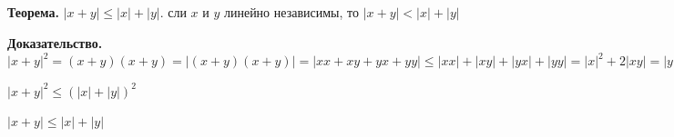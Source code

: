 \documentclass[a4paper]{article}
\begin{document}
\begin{htheorem}
\textbf{Теорема.} $|x+y| \leq |x|+|y|$. сли $x$ и $y$ линейно независимы, то $|x+y| < |x|+ |y|$
\end{htheorem}

\begin{hproof}
\textbf{Доказательство.} 
$|x+y|^2 = (x+y)(x+y) = |(x+y)(x+y)| = |xx+xy+yx+yy| \leq |xx| + |xy| + |yx| + |yy| = |x|^2 + 2|xy| = |y|^2 \leq |x|^2 + 2|x||y| + |y|^2 = (|x| + |y|)^2$

$|x+y|^2 \leq (|x| + |y|)^2$

$|x+y| \leq |x| + |y|$
\end{hproof}

\subsection*{}
\subsection*{}
\subsection*{}
\subsection*{}
\subsection*{}
\subsection*{}
\subsection*{}
\subsection*{}
\subsection*{}
\subsection*{}
\subsection*{}
\end{document}
